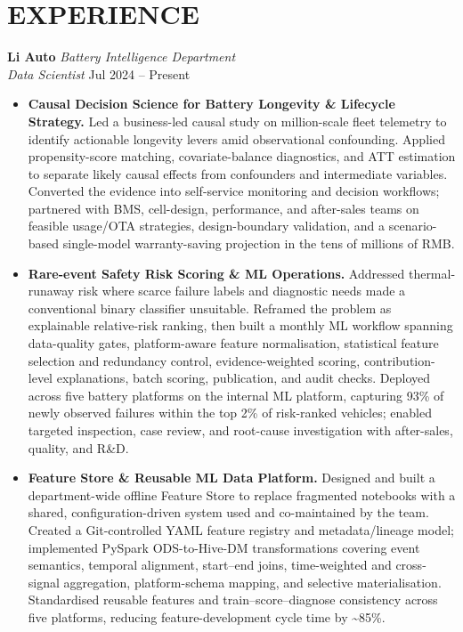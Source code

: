 \documentclass[a4paper,10pt]{article}
\begin{document}
\section{EXPERIENCE}
\noindent\textbf{Li Auto} \hfill \textit{Battery Intelligence Department}\\
\textit{Data Scientist} \hfill Jul 2024 -- Present
\begin{itemize}
\item \textbf{Causal Decision Science for Battery Longevity \& Lifecycle Strategy.} Led a business-led causal study on million-scale fleet telemetry to identify actionable longevity levers amid observational confounding. Applied propensity-score matching, covariate-balance diagnostics, and ATT estimation to separate likely causal effects from confounders and intermediate variables. Converted the evidence into self-service monitoring and decision workflows; partnered with BMS, cell-design, performance, and after-sales teams on feasible usage/OTA strategies, design-boundary validation, and a scenario-based single-model warranty-saving projection in the tens of millions of RMB.
\item \textbf{Rare-event Safety Risk Scoring \& ML Operations.} Addressed thermal-runaway risk where scarce failure labels and diagnostic needs made a conventional binary classifier unsuitable. Reframed the problem as explainable relative-risk ranking, then built a monthly ML workflow spanning data-quality gates, platform-aware feature normalisation, statistical feature selection and redundancy control, evidence-weighted scoring, contribution-level explanations, batch scoring, publication, and audit checks. Deployed across five battery platforms on the internal ML platform, capturing 93\% of newly observed failures within the top 2\% of risk-ranked vehicles; enabled targeted inspection, case review, and root-cause investigation with after-sales, quality, and R\&D.
\item \textbf{Feature Store \& Reusable ML Data Platform.} Designed and built a department-wide offline Feature Store to replace fragmented notebooks with a shared, configuration-driven system used and co-maintained by the team. Created a Git-controlled YAML feature registry and metadata/lineage model; implemented PySpark ODS-to-Hive-DM transformations covering event semantics, temporal alignment, start--end joins, time-weighted and cross-signal aggregation, platform-schema mapping, and selective materialisation. Standardised reusable features and train--score--diagnose consistency across five platforms, reducing feature-development cycle time by \textasciitilde85\%.

\end{itemize}
\end{document}

